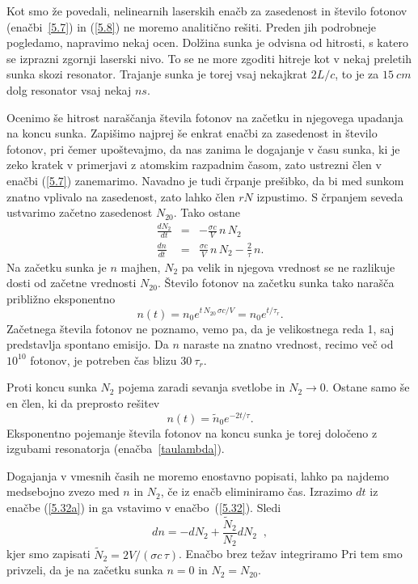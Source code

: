 Kot smo že povedali, nelinearnih laserskih enačb za zasedenost in število fotonov
(enačbi~\ref{5.7}) in (\ref{5.8}) ne moremo analitično rešiti. Preden jih podrobneje
pogledamo, napravimo nekaj ocen. Dolžina sunka je odvisna od hitrosti, 
s katero se izprazni zgornji laserski nivo. To se ne more zgoditi
hitreje kot v nekaj preletih sunka skozi resonator. Trajanje sunka je torej
vsaj nekajkrat $2L/c$, to je za $15~\si{cm}$ dolg resonator vsaj nekaj $\si{ns}$.

Ocenimo še hitrost naraščanja števila fotonov na začetku in 
njegovega upadanja na koncu sunka. Zapišimo najprej še enkrat enačbi za zasedenost in število
fotonov, pri čemer upoštevajmo, da nas zanima le dogajanje v času sunka,
ki je zeko kratek v primerjavi z atomskim razpadnim časom, zato 
ustrezni člen v enačbi (\ref{5.7}) zanemarimo. Navadno je tudi črpanje prešibko, da
bi med sunkom znatno vplivalo na zasedenost, zato lahko člen $rN$
izpustimo. S črpanjem seveda ustvarimo začetno zasedenost $N_{20}$. Tako
ostane 
\begin{eqnarray}  
\frac{d N_2}{d t}&=&-\frac{\sigma c}{V}\,n\,N_2 \label{5.32a}\\
\frac{d n}{d t}&=&\frac{\sigma c}{V}\,n\,N_2 - \frac{2}{\tau}\,n.
\label{5.32}
\end{eqnarray}
Na začetku sunka je $n$ majhen, $N_2$ pa velik in njegova vrednost
se ne razlikuje dosti od začetne vrednosti $N_{20}$. Število fotonov
na začetku sunka tako narašča približno eksponentno
\begin{equation}  
n(t)=n_0e^{t\,N_{20}\,\sigma c/V}= n_0e^{t/\tau_r}.
\label{5.33}
\end{equation}
Začetnega števila fotonov ne poznamo, vemo pa, da je velikostnega reda 1,
saj predstavlja spontano emisijo. Da $n$ naraste na znatno
vrednost, recimo več od $10^{10}$ fotonov, je potreben čas blizu $30~\tau_r$.

Proti koncu sunka $N_2$ pojema zaradi sevanja svetlobe in $N_2 \to 0$. Ostane
samo še en člen, ki da preprosto rešitev
\begin{equation}  
n(t)=\tilde{n}_0e^{-2t/\tau}.
\label{5.33a}
\end{equation}
Eksponentno pojemanje števila fotonov na koncu sunka je torej določeno z izgubami
resonatorja (enačba~\ref{taulambda}). 

Dogajanja v vmesnih časih ne moremo enostavno popisati, lahko pa najdemo
medsebojno zvezo med $n$ in $N_2$, če iz enačb eliminiramo čas. 
Izrazimo $dt$ iz enačbe (\ref{5.32a}) in ga vstavimo v enačbo~(\ref{5.32}).
Sledi
\begin{equation}
dn=-dN_{2}+\frac{\tilde{N}_2}{N_{2}}dN_{2}\;\;,  \label{5.341}
\end{equation}
kjer smo zapisati $\tilde{N}_{2}=2V/(\sigma c\,\tau)$.
Enačbo brez težav integriramo
Pri tem smo privzeli, da je na začetku sunka $n=0$ in $N_{2}=N_{20}$. 

